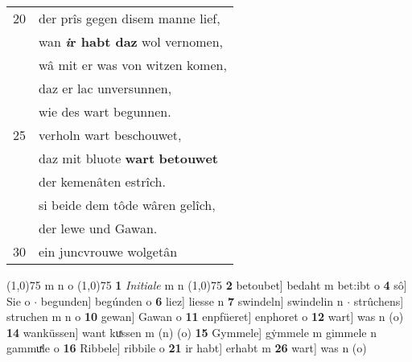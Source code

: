 \documentclass[8pt,a4paper,notitlepage]{article}
\begin{document}
\begin{table}[ht]
\begin{minipage}[t]{0.5\linewidth}
\begin{tabular}{rl}
20 & der prîs gegen disem manne lief,\\ 
 & wan \textbf{\textit{i}r habt daz} wol vernomen,\\ 
 & wâ mit er was von witzen komen,\\ 
 & daz er lac unversunnen,\\ 
 & wie des wart begunnen.\\ 
25 & verholn wart beschouwet,\\ 
 & daz mit bluote \textbf{wart} \textbf{betouwet}\\ 
 & der kemenâten estrîch.\\ 
 & si beide dem tôde wâren gelîch,\\ 
 & der lewe und Gawan.\\ 
30 & ein juncvrouwe wolgetân\\ 
\end{tabular}
\scriptsize
\line(1,0){75} \newline
m n o \newline
\line(1,0){75} \newline
\textbf{1} \textit{Initiale} m n  \newline
\line(1,0){75} \newline
\textbf{2} betoubet] bedaht m bet:ibt o \textbf{4} sô] Sie o  $\cdot$ begunden] begúnden o \textbf{6} liez] liesse n \textbf{7} swindeln] swindelin n  $\cdot$ strûchens] struchen m n o \textbf{10} gewan] Gawan o \textbf{11} enpfüeret] enphoret o \textbf{12} wart] was n (o) \textbf{14} wanküssen] want kuͯssen m (n) (o) \textbf{15} Gymmele] gẏmmele m gimmele n gammuͯle o \textbf{16} Ribbele] ribbile o \textbf{21} ir habt] erhabt m \textbf{26} wart] was n (o) \newline
\end{minipage}
\end{table}
\newpage
\end{document}
